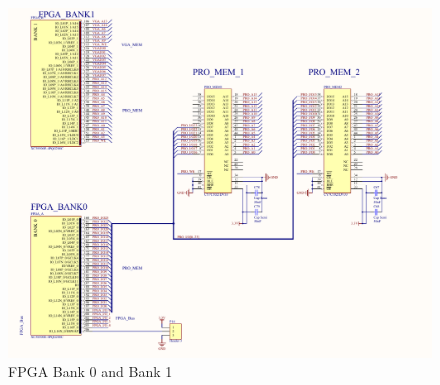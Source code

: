 \begin{figure}[h]
  \centering
  \includegraphics[width=\textwidth]{fig/pcb/schematics/pcbschematic_fpgab01.pdf}
  \caption{FPGA Bank 0 and Bank 1}
  \label{fig:schematic-pcb-fpgab01}
\end{figure}
